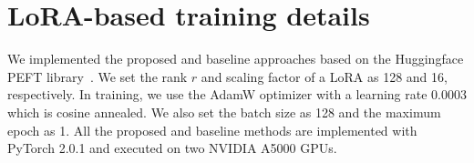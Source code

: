 \section{LoRA-based training details}
We implemented the proposed and baseline approaches based on the Huggingface PEFT library~\cite{peft}. We set the rank $r$ and scaling factor of a LoRA as 128 and 16, respectively. In training, we use the AdamW optimizer with a learning rate 0.0003 which is cosine annealed. We also set the batch size as 128 and the maximum epoch as 1. All the proposed and baseline methods are implemented with PyTorch 2.0.1 and executed on two NVIDIA A5000 GPUs.



